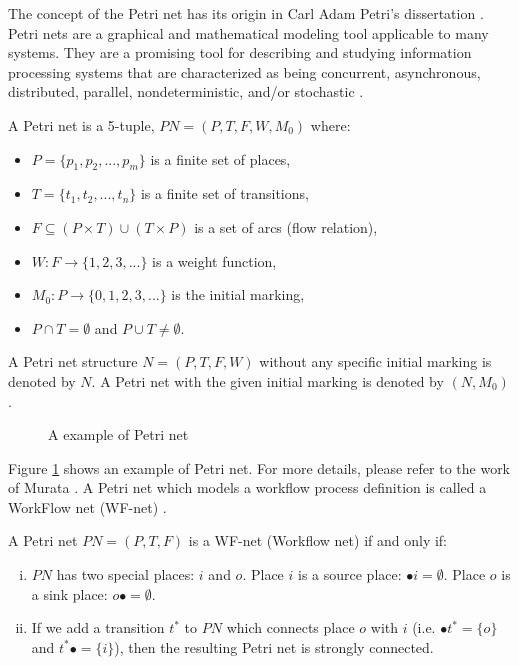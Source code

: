 \documentclass{llncs}
\begin{document}
The concept of the Petri net has its origin in Carl Adam Petri's dissertation \cite{petri1966kommunikation}. Petri nets are a graphical and mathematical modeling tool applicable to many systems. They are a promising tool for describing and studying information processing systems that are characterized as being concurrent, asynchronous, distributed, parallel, nondeterministic, and/or stochastic \cite{murata1989petri}.

\begin{definition}\label{def:petrinet}
A Petri net is a 5-tuple, $PN=(P,T,F,W,M_{0})$ where:
	\begin{itemize}
		\item[] $P=\{p_{1},p_{2},...,p_{m}\}$ is a finite set of places,
		\item[] $T=\{t_{1},t_{2},...,t_{n}\}$ is a finite set of transitions,
		\item[] $F\subseteq(P\times T)\cup(T\times P)$ is a set of arcs (flow relation),
		\item[] $W:F\rightarrow\{1,2,3,...\}$ is a weight function,
		\item[] $M_{0}:P\rightarrow\{0,1,2,3,...\}$ is the initial marking,
		\item[] $P\cap T=\emptyset$ and $P\cup T\neq\emptyset$.
	\end{itemize}
A Petri net structure $N=(P,T,F,W)$ without any specific initial marking is denoted by $N$. A Petri net with the given initial marking is denoted by $(N,M_{0})$.
\end{definition}

\begin{figure}[H]
	\centering
	\caption{A example of Petri net\label{fig:exPetri}}
\end{figure}

Figure \ref{fig:exPetri} shows an example of Petri net. For more details, please refer to the work of Murata \cite{murata1989petri}. A Petri net which models a workflow process definition is called a WorkFlow net (WF-net) \cite{van1998application}.

\begin{definition}[WF-net]\label{def:wfnet}
A Petri net $PN=(P,T,F)$ is a WF-net (Workflow net) if and only if:
	\begin{enumerate}[(i)]
		\item $PN$ has two special places: $i$ and $o$. Place $i$ is a source place: $\bullet i=\emptyset$. Place $o$ is a sink place: $o\bullet =\emptyset$.
		\item If we add a transition $t^{*}$ to $PN$ which connects place $o$ with $i$ (i.e. $\bullet t^{*}=\{o\}$ and $t^{*}\bullet=\{i\}$), then the resulting Petri net is strongly connected.
	\end{enumerate}
\end{definition}
\end{document}

